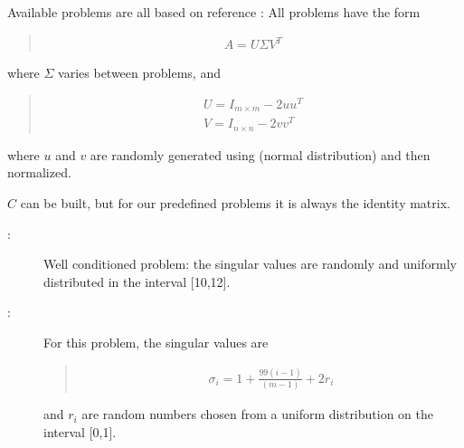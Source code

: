 \documentclass[a4paper,10pt,english]{sphinxmanual}
\begin{document}
\begin{fulllineitems}
\begin{fulllineitems}

Available problems are all based on reference \label{\detokenize{skprocrustes:id2}}{\hyperref[\detokenize{skprocrustes:zhandu06}]{\sphinxcrossref{{[}ZD06{]}}}}:
All problems have the form
\begin{quote}
\begin{equation*}
\begin{split}A = U\Sigma V^T\end{split}
\end{equation*}\end{quote}

where \(\Sigma\) varies between problems, and
\begin{quote}
\begin{equation*}
\begin{split}U = I_{m\times m} - 2uu^T\\
V = I_{n\times n} - 2vv^T\end{split}
\end{equation*}\end{quote}

where \(u\) and \(v\) are randomly generated using 
 (normal distribution) and then normalized.

\(C\) can be built, but for our predefined problems it is always
the identity matrix.
\begin{description}
\item[{:}] \leavevmode
Well conditioned problem: the singular values are randomly and 
uniformly distributed in the interval {[}10,12{]}.

\item[{:}] \leavevmode
For this problem, the singular values are
\begin{quote}
\begin{equation*}
\begin{split}\sigma_i = 1 + \frac{99(i-1)}{(m-1)} + 2r_i\end{split}
\end{equation*}\end{quote}

and \(r_i\) are random numbers chosen from a uniform distribution
on the interval {[}0,1{]}.


\end{description}
\end{fulllineitems}
\end{fulllineitems}
\end{document}
